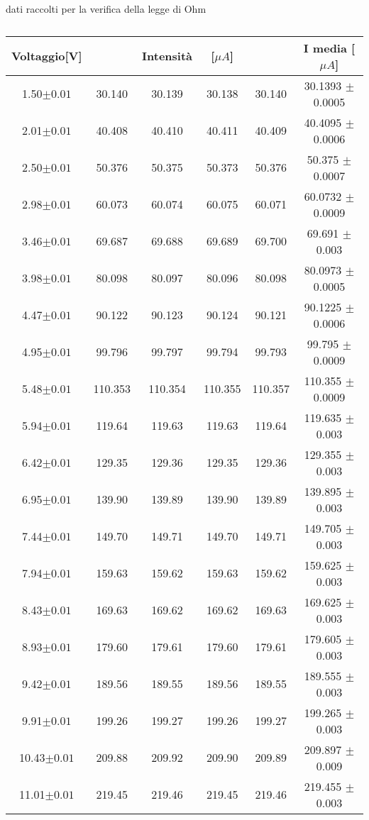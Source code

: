 \documentclass[a4paper]{article}
\theoremstyle{definition}
\begin{document}
\begin{table}[!ht]
\centering
    \captionsetup{labelformat=empty}
    \caption{dati raccolti per la verifica della legge di Ohm}
    \begin{tabular}{c|cccc|c}
        Voltaggio[V] & &Intensità&[$\mu A$]& & I media [$\mu A$] \\
        \hline
        \hline
        1.50\(\pm 0.01\)&30.140& 30.139& 30.138& 30.140& 30.1393 \(\pm\) 0.0005\\
        2.01\(\pm 0.01\)&40.408& 40.410& 40.411& 40.409& 40.4095 \(\pm\) 0.0006\\
        2.50\(\pm 0.01\)&50.376& 50.375& 50.373& 50.376& 50.375 \(\pm\) 0.0007\\
        2.98\(\pm 0.01\)&60.073& 60.074& 60.075& 60.071& 60.0732 \(\pm\) 0.0009\\
        3.46\(\pm 0.01\)&69.687& 69.688& 69.689& 69.700& 69.691 \(\pm\) 0.003\\
        3.98\(\pm 0.01\)&80.098& 80.097& 80.096& 80.098& 80.0973 \(\pm\) 0.0005\\
        4.47\(\pm 0.01\)&90.122& 90.123& 90.124& 90.121& 90.1225 \(\pm\) 0.0006\\
        4.95\(\pm 0.01\)&99.796& 99.797& 99.794& 99.793& 99.795 \(\pm\) 0.0009\\
        5.48\(\pm 0.01\)&110.353& 110.354& 110.355& 110.357& 110.355 \(\pm\) 0.0009\\
        5.94\(\pm 0.01\)&119.64& 119.63& 119.63& 119.64&  119.635 \(\pm\) 0.003\\
        6.42\(\pm 0.01\)&129.35& 129.36& 129.35& 129.36& 129.355 \(\pm\) 0.003\\
        6.95\(\pm 0.01\)&139.90& 139.89& 139.90& 139.89& 139.895 \(\pm\) 0.003\\
        7.44\(\pm 0.01\)&149.70& 149.71& 149.70& 149.71& 149.705 \(\pm\) 0.003\\
        7.94\(\pm 0.01\)&159.63& 159.62& 159.63& 159.62& 159.625 \(\pm\) 0.003\\
        8.43\(\pm 0.01\)&169.63& 169.62& 169.62& 169.63& 169.625 \(\pm\) 0.003\\
        8.93\(\pm 0.01\)&179.60& 179.61& 179.60& 179.61& 179.605 \(\pm\) 0.003\\
        9.42\(\pm 0.01\)&189.56& 189.55& 189.56& 189.55& 189.555 \(\pm\) 0.003\\
        9.91\(\pm 0.01\)&199.26& 199.27& 199.26& 199.27& 199.265 \(\pm\) 0.003\\
        10.43\(\pm 0.01\)&209.88& 209.92& 209.90& 209.89& 209.897 \(\pm\) 0.009\\
        11.01\(\pm 0.01\)&219.45& 219.46& 219.45& 219.46& 219.455 \(\pm\) 0.003\\
        \hline
        \hline
    \end{tabular}

     \caption{}	
\end{table}
\end{document}
